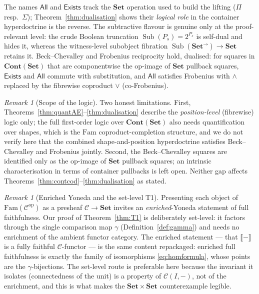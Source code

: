 \documentclass[11pt]{amsart}
\theoremstyle{plain}
\theoremstyle{definition}
\theoremstyle{remark}
\newtheorem{remark}[theorem]{Remark}
\newcommand{\C}{\mathcal{C}}
\newcommand{\Set}{\mathbf{Set}}
\newcommand{\Fam}{\mathrm{Fam}}
\newcommand{\Cont}{\mathbf{Cont}}
\newcommand{\ext}[1]{\llbracket #1 \rrbracket}
\newcommand{\op}{\mathrm{op}}
\DeclareMathOperator{\Sub}{Sub}
\newcommand{\Arr}[1]{#1^{\rightarrow}}
\newcommand{\Exists}{\mathsf{Exists}}
\newcommand{\All}{\mathsf{All}}
\begin{document}
The names $\All$ and $\Exists$ track the $\Set$ operation used to build the lifting
($\Pi$ resp.\ $\Sigma$); Theorem~\ref{thm:dualisation} shows their \emph{logical role} in the
container hyperdoctrine is the reverse. The subtractive flavour is genuine only at the proof-relevant
level: the crude Boolean truncation $\Sub(P_s)=2^{P_s}$ is self-dual and hides it, whereas the
witness-level subobject fibration $\Sub(\Arr{\Set})\to\Set$ retains it. Beck--Chevalley and Frobenius
reciprocity hold, dualised: for squares in $\Cont(\Set)$ that are componentwise the op-image of $\Set$
pullback squares, $\Exists$ and $\All$ commute with substitution, and $\All$ satisfies Frobenius with
$\wedge$ replaced by the fibrewise coproduct $\vee$ (co-Frobenius).

\begin{remark}[Scope of the logic]\label{rem:logicscope}
Two honest limitations. First, Theorems~\ref{thm:quantAE}--\ref{thm:dualisation} describe the
\emph{position-level} (fibrewise) logic only; the full first-order logic over $\Cont(\Set)$ also needs
quantification over shapes, which is the $\Fam$ coproduct-completion structure, and we do not verify
here that the combined shape-and-position hyperdoctrine satisfies Beck--Chevalley and Frobenius
jointly. Second, the Beck--Chevalley squares are identified only as the op-image of $\Set$ pullback
squares; an intrinsic characterisation in terms of container pullbacks is left open. Neither gap
affects Theorems~\ref{thm:contcod}--\ref{thm:dualisation} as stated.
\end{remark}

\begin{remark}[Enriched Yoneda and the set-level T1]\label{rem:enriched}
Presenting each object of $\Fam(\C^\op)$ as a presheaf $\C\to\Set$ invites an \emph{enriched}-Yoneda
statement of full faithfulness. Our proof of Theorem~\ref{thm:T1} is deliberately set-level: it
factors through the single comparison map $\gamma$ (Definition~\ref{def:gamma}) and needs no
enrichment of the ambient functor category. The enriched statement --- that $\ext{-}$ is a fully
faithful $\C$-functor --- is the same content repackaged: enriched full faithfulness is exactly the
family of isomorphisms \eqref{eq:homformula}, whose points are the $\gamma$-bijections. The set-level
route is preferable here because the invariant it isolates (connectedness of the unit) is a property
of $\C(I,-)$, not of the enrichment, and this is what makes the $\Set\times\Set$ counterexample
legible.
\end{remark}
\end{document}
